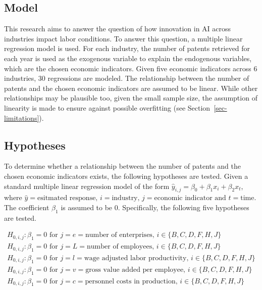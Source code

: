 \documentclass[
  12pt,
  a4paperpaper,
]{article}
\begin{document}
\subsection{Model}\label{sec-model}

This research aims to answer the question of how innovation in AI across
industries impact labor conditions. To answer this question, a multiple
linear regression model is used. For each industry, the number of
patents retrieved for each year is used as the exogenous variable to
explain the endogenous variables, which are the chosen economic
indicators. Given five economic indicators across 6 industries, 30
regressions are modeled. The relationship between the number of patents
and the chosen economic indicators are assumed to be linear. While other
relationships may be plausible too, given the small sample size, the
assumption of linearity is made to ensure against possible overfitting
(see Section~\ref{sec-limitations}).

\subsection{Hypotheses}\label{sec-hypotheses}

To determine whether a relationship between the number of patents and
the chosen economic indicators exists, the following hypotheses are
tested. Given a standard multiple linear regression model of the form
\(\hat{y}_{i,j} = \beta_0 + \beta_1x_i + \beta_2x_t\), where
\(\hat{y}=\text{esitmated response, }i=\text{industry, }j=\text{economic indicator }\text{and }t=\text{time}\).
The coefficient \(\beta_1\) is assumed to be \(0\). Specifically, the
following five hypotheses are tested.

\begin{align}
H_{0, i, j}: \beta_1 = 0\text{ for }j=e=\text{number of enterprises, } i\in\{B, C, D, F, H, J\} \\
H_{0, i, j}: \beta_1 = 0\text{ for }j=L=\text{number of employees, } i\in\{B, C, D, F, H, J\}\\
H_{0, i, j}: \beta_1 = 0\text{ for }j=l=\text{wage adjusted labor productivity, } i\in\{B, C, D, F, H, J\}\\
H_{0, i, j}: \beta_1 = 0\text{ for }j=v=\text{gross value added per employee, } i\in\{B, C, D, F, H, J\}\\
H_{0, i, j}: \beta_1 = 0\text{ for }j=c=\text{personnel costs in production, } i\in\{B, C, D, F, H, J\}
\end{align}
\end{document}
